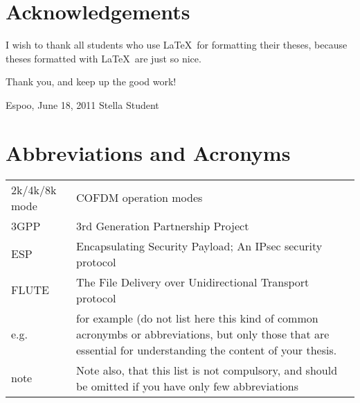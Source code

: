 \documentclass[12pt,a4paper,oneside,pdftex]{report}
\newcommand{\DATE}{June 18, 2011}
\newcommand{\AUTHOR}{Stella Student}
\begin{document}


\chapter*{Acknowledgements}

I wish to thank all students who use \LaTeX\ for formatting their theses,
because theses formatted with \LaTeX\ are just so nice.

Thank you, and keep up the good work!
\vskip 10mm

\noindent Espoo, \DATE
\vskip 5mm
\noindent\AUTHOR

\cleardoublepage
% 

\chapter*{Abbreviations and Acronyms}


\noindent
\begin{longtable}{@{}p{}p{}@{}}
2k/4k/8k mode & COFDM operation modes \\
3GPP & 3rd Generation Partnership Project \\
ESP & Encapsulating Security Payload; An IPsec security protocol \\
FLUTE  & The File Delivery over Unidirectional Transport protocol \\
e.g.& for example (do not list here this kind of common acronymbs or abbreviations, but only those that are essential for understanding the content of your thesis. \\
note & Note also, that this list is not compulsory, and should be omitted if you have only few abbreviations

\end{longtable}
\end{document}
